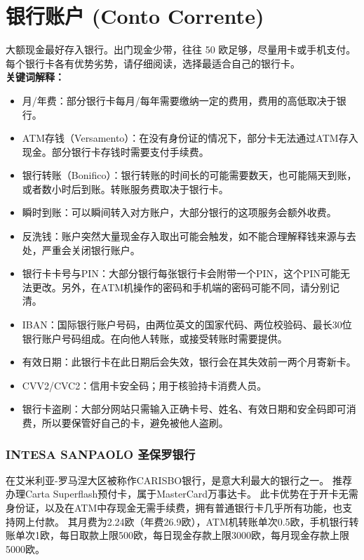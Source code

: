 \section{银行账户 (Conto Corrente)}

大额现金最好存入银行。出门现金少带，往往 50 欧足够，尽量用卡或手机支付。
每个银行卡各有优势劣势，请仔细阅读，选择最适合自己的银行卡。\\
\textbf{关键词解释：}\\
\begin{itemize}
\item 月/年费：部分银行卡每月/每年需要缴纳一定的费用，费用的高低取决于银行。
\item ATM存钱（Versamento）：在没有身份证的情况下，部分卡无法通过ATM存入现金。部分银行卡存钱时需要支付手续费。
\item 银行转账（Bonifico）：银行转账的时间长的可能需要数天，也可能隔天到账，或者数小时后到账。转账服务费取决于银行卡。
\item 瞬时到账：可以瞬间转入对方账户，大部分银行的这项服务会额外收费。
\item 反洗钱：账户突然大量现金存入取出可能会触发，如不能合理解释钱来源与去处，严重会关闭银行账户。
\item 银行卡卡号与PIN：大部分银行每张银行卡会附带一个PIN，这个PIN可能无法更改。另外，在ATM机操作的密码和手机端的密码可能不同，请分别记清。
\item IBAN：国际银行账户号码，由两位英文的国家代码、两位校验码、最长30位银行账户号码组成。在向他人转账，或接受转账时需要提供。
\item 有效日期：此银行卡在此日期后会失效，银行会在其失效前一两个月寄新卡。
\item CVV2/CVC2：信用卡安全码；用于核验持卡消费人员。
\item 银行卡盗刷：大部分网站只需输入正确卡号、姓名、有效日期和安全码即可消费，所以要保管好自己的卡，避免被他人盗刷。
\end{itemize}

\subsubsection{INTESA SANPAOLO 圣保罗银行}

在艾米利亚-罗马涅大区被称作CARISBO银行，是意大利最大的银行之一。
推荐办理Carta Superflash预付卡，属于MasterCard万事达卡。
此卡优势在于开卡无需身份证，以及在ATM中存现金无需手续费，拥有普通银行卡几乎所有功能，也支持网上付款。
其月费为2.24欧（年费26.9欧），ATM机转账单次0.5欧，手机银行转账单次1欧，每日取款上限500欧，每日现金存款上限3000欧，每月现金存款上限5000欧。

